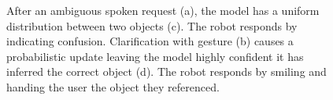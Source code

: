 \documentclass[a4paper, 11pt]{article} %
\begin{document}
\begin{figure}[h]
\centering
{}
\caption{After an ambiguous spoken request (a), the model has a uniform
  distribution between two objects (c).  The robot responds by
  indicating confusion.  Clarification with gesture (b) causes a
  probabilistic update leaving the model highly confident it has
  inferred the correct object (d).  The robot responds by smiling and handing the user the object they referenced. \label{fig:cartoon}}
\end{figure}
\end{document}
